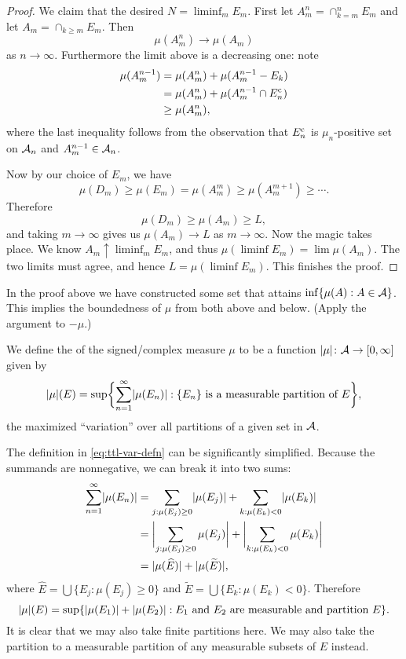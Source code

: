 \begin{proof}
    We claim that the desired $N = \liminf_m E_m$. First let $A_m^n=\cap_{k=m}^n E_m$ and let $A_m = \cap_{k\geq m}E_m$. Then  \[\mu(A_m^n)\to \mu(A_m)\] as $n\to \infty$. Furthermore the limit above is a decreasing one: note \begin{align*}
        \mu(A_m^{n-1}) & = \mu(A_m^n) + \mu(A_m^{n-1} - E_k) \\
        & = \mu(A_m^n) + \mu(A_m^{n-1}\cap E_n^{\mathrm{c}}) \\
        & \geq \mu(A_m^n), 
    \end{align*}
    where the last inequality follows from the observation that $E_n^{\mathrm{c}}$ is $\mu_n$-positive set on $\mathcal{A}_n$ and $A_m^{n-1} \in \mathcal{A}_n$.

    Now by our choice of $E_m$, we have \[
        \mu(D_m) \geq \mu(E_m) = \mu(A_m^m)\geq \mu(A_m^{m+1}) \geq \dotsb.
    \] Therefore \[\mu(D_m) \geq \mu(A_m) \geq L,\] and taking $m \to \infty$ gives us $\mu(A_m) \to L$ as $m\to \infty$. Now the magic takes place. We know $A_m \uparrow \liminf_m E_m$, and thus $\mu(\liminf E_m) = \lim \mu(A_m)$. The two limits must agree, and hence $L = \mu(\liminf E_m)$. This finishes the proof. 
\end{proof}

In the proof above we have constructed some set that attains $\inf\{\mu(A):A\in \mathcal{A}\}$. This implies the boundedness of $\mu$ from both above and below. (Apply the argument to $-\mu$.)

We define the  of the signed/complex measure $\mu$ to be a function $\lvert \mu \rvert\colon \mathcal{A} \to [0,\infty]$ given by \begin{equation} \label{eq:ttl-var-defn}
    \lvert \mu \rvert(E) = \sup\biggl\{\sum_{n=1}^\infty \lvert \mu(E_n) \rvert : \{E_n\}\text{ is a measurable partition of } E\biggr\},
\end{equation}
the maximized ``variation'' over all partitions of a given set in $\mathcal{A}$.

The definition in \eqref{eq:ttl-var-defn} can be significantly simplified. Because the summands are nonnegative, we can break it into two sums: \begin{align*}
    \sum_{n=1}^\infty \lvert \mu(E_n) \rvert & = \sum_{j:\mu(E_j) \geq 0} \lvert \mu(E_j) \rvert + \sum_{k:\mu(E_k) < 0} \lvert \mu(E_k) \rvert \\
    & = \biggl\vert\sum_{j:\mu(E_j) \geq 0} \mu(E_j)\biggr\vert + \biggl\vert\sum_{k:\mu(E_k)<0} \mu(E_k)\biggr\vert \\ & = 
    \lvert \mu(\widehat{E}) \rvert + \lvert \mu(\widetilde{E}) \rvert,
\end{align*}
where $\widehat{E} = \bigcup\{E_j : \mu(E_j) \geq 0\}$ and $\widetilde{E} = \bigcup\{E_k : \mu(E_k) < 0\}$.
Therefore \begin{equation} \label{eq:ttl-var-equiv}
    \lvert \mu \rvert(E) = \sup\{ \lvert \mu(E_1) \rvert + \lvert \mu(E_2) \rvert : E_1\text{ and } E_2 \text{ are measurable and partition } E\}.
\end{equation} It is clear that we may also take finite partitions here. We may also take the partition to a measurable partition of any measurable subsets of $E$ instead.

